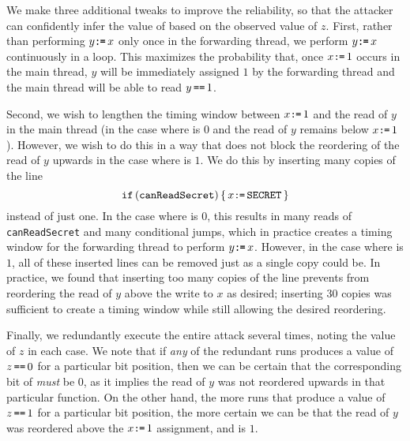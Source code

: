 We make three additional tweaks to improve the reliability, so that the attacker
can confidently infer the value of {\SEC} based on the observed value of $z$.
  First, rather than performing $y\texttt{:}\mkern-1mu\texttt{=}\, x$ only once in the forwarding thread,
we perform $y\texttt{:}\mkern-1mu\texttt{=}\, x$ continuously in a loop.
This maximizes the probability that, once $x\texttt{:}\mkern-1mu\texttt{=}\, 1$ occurs in the main
thread, $y$ will be immediately assigned $1$ by the forwarding thread
and the main thread will be able to read $y\,\texttt{==}\, 1$.

Second, we wish to lengthen the timing window between $x\texttt{:}\mkern-1mu\texttt{=}\, 1$ and the
read of $y$ in the main thread (in the case where
{\SEC} is $0$ and the read of $y$ remains below $x\texttt{:}\mkern-1mu\texttt{=}\, 1$).
However, we wish to do this in a way that does not block the reordering of the
read of $y$ upwards in the case where {\SEC} is $1$.
We do this by inserting many copies of the line
\[
  \texttt{if}\, (\texttt{canReadSecret}) \,\{\, x\texttt{:}\mkern-1mu\texttt{=}\,\texttt{SECRET}\,\}
\]
instead of just one.
In the case where {\SEC} is $0$, this
results in many reads of \verb|canReadSecret| and many conditional jumps,
which in practice creates a timing window for the forwarding thread to perform
$y\texttt{:}\mkern-1mu\texttt{=}\, x$.
However, in the case where {\SEC} is $1$,
all of these inserted lines can be removed just as a single copy could be.
In practice, we found that inserting too many copies of the line prevents
{\GCC} from reordering the read of $y$ above the write to $x$ as
desired; inserting $30$ copies was sufficient to create a timing window
while still allowing the desired reordering.

Finally, we redundantly execute the entire attack several times, noting the
value of $z$ in each case.
We note that if \emph{any} of the redundant runs produces a value of
$z\,\texttt{==}\,0$ for a particular bit position, then we can be certain that the
corresponding bit of {\SEC} \emph{must} be $0$, as it implies the
read of $y$ was not reordered upwards in that particular function.
On the other hand, the more runs that produce a value of $z\,\texttt{==}\,1$ for a
particular bit position, the more certain we can be that the read of $y$
was reordered above the $x\texttt{:}\mkern-1mu\texttt{=}\, 1$ assignment, and {\SEC} is $1$.

